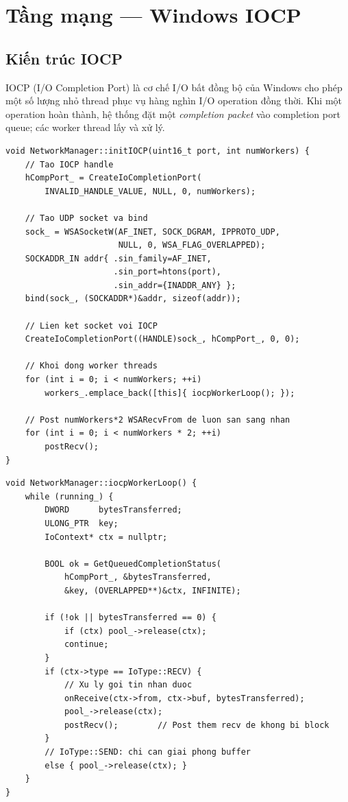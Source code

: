 \documentclass[12pt,a4paper]{report}
\begin{document}
\section{Tầng mạng --- Windows IOCP}

\subsection{Kiến trúc IOCP}

IOCP (I/O Completion Port) là cơ chế I/O bất đồng bộ của Windows cho phép một số lượng nhỏ thread phục vụ hàng nghìn I/O operation đồng thời. Khi một operation hoàn thành, hệ thống đặt một \textit{completion packet} vào completion port queue; các worker thread lấy và xử lý.

\begin{lstlisting}[style=cppStyle, caption={Khởi tạo IOCP và UDP socket}, label={lst:iocpinit}]
void NetworkManager::initIOCP(uint16_t port, int numWorkers) {
    // Tao IOCP handle
    hCompPort_ = CreateIoCompletionPort(
        INVALID_HANDLE_VALUE, NULL, 0, numWorkers);

    // Tao UDP socket va bind
    sock_ = WSASocketW(AF_INET, SOCK_DGRAM, IPPROTO_UDP,
                       NULL, 0, WSA_FLAG_OVERLAPPED);
    SOCKADDR_IN addr{ .sin_family=AF_INET,
                      .sin_port=htons(port),
                      .sin_addr={INADDR_ANY} };
    bind(sock_, (SOCKADDR*)&addr, sizeof(addr));

    // Lien ket socket voi IOCP
    CreateIoCompletionPort((HANDLE)sock_, hCompPort_, 0, 0);

    // Khoi dong worker threads
    for (int i = 0; i < numWorkers; ++i)
        workers_.emplace_back([this]{ iocpWorkerLoop(); });

    // Post numWorkers*2 WSARecvFrom de luon san sang nhan
    for (int i = 0; i < numWorkers * 2; ++i)
        postRecv();
}
\end{lstlisting}

\begin{lstlisting}[style=cppStyle, caption={IOCP worker loop --- xử lý completion packets}, label={lst:iocpworker}]
void NetworkManager::iocpWorkerLoop() {
    while (running_) {
        DWORD      bytesTransferred;
        ULONG_PTR  key;
        IoContext* ctx = nullptr;

        BOOL ok = GetQueuedCompletionStatus(
            hCompPort_, &bytesTransferred,
            &key, (OVERLAPPED**)&ctx, INFINITE);

        if (!ok || bytesTransferred == 0) {
            if (ctx) pool_->release(ctx);
            continue;
        }
        if (ctx->type == IoType::RECV) {
            // Xu ly goi tin nhan duoc
            onReceive(ctx->from, ctx->buf, bytesTransferred);
            pool_->release(ctx);
            postRecv();        // Post them recv de khong bi block
        }
        // IoType::SEND: chi can giai phong buffer
        else { pool_->release(ctx); }
    }
}
\end{lstlisting}
\end{document}
